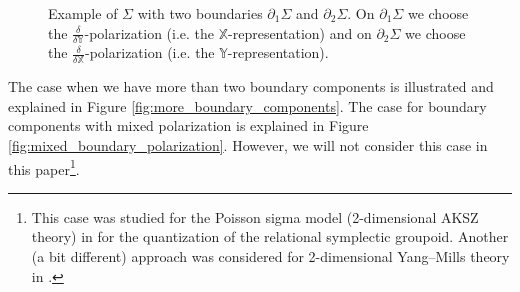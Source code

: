 \documentclass[11pt,colorinlistoftodos]{amsart}
\numberwithin{equation}{subsection}
\theoremstyle{plain}
\theoremstyle{definition}
\theoremstyle{remark}
\newcommand{\de}{\partial}
\begin{document}
\begin{figure}[h!]
    \centering
    \caption{Example of $\Sigma$ with two boundaries $\de_1\Sigma$ and $\de_2\Sigma$. On $\de_1\Sigma$ we choose the $\frac{\delta}{\delta\mathds{Y}}$-polarization (i.e. the $\mathds{X}$-representation) and on $\de_2\Sigma$ we choose the $\frac{\delta}{\delta\mathds{X}}$-polarization (i.e. the $\mathds{Y}$-representation).}
    \label{fig:boundary_polarization_BF}
\end{figure}

The case when we have more than two boundary components is illustrated and explained in Figure \ref{fig:more_boundary_components}. The case for boundary components with mixed polarization is explained in Figure \ref{fig:mixed_boundary_polarization}. However, we will not consider this case in this paper\footnote{This case was studied for the Poisson sigma model (2-dimensional AKSZ theory) in \cite{CMW3} for the quantization of the relational symplectic groupoid. Another (a bit different) approach was considered for 2-dimensional Yang--Mills theory in \cite{IM}.}.
\end{document}
